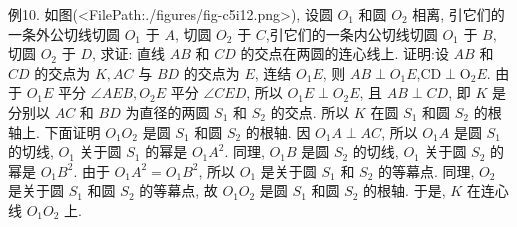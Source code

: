 例10. 如图(<FilePath:./figures/fig-c5i12.png>), 设圆 $O_1$ 和圆 $O_2$ 相离, 引它们的一条外公切线切圆 $O_1$ 于 $A$, 切圆 $O_2$ 于 $C$,引它们的一条内公切线切圆 $O_1$ 于 $B$, 切圆 $O_2$ 于 $D$, 求证: 直线 $A B$ 和 $C D$ 的交点在两圆的连心线上.
证明:设 $A B$ 和 $C D$ 的交点为 $K, A C$ 与 $B D$ 的交点为 $E$, 连结 $O_1 E$, 则 $A B \perp O_1 E$,$\mathrm{CD} \perp \mathrm{O}_2 E$.
由于 $O_1 E$ 平分 $\angle A E B, O_2 E$ 平分 $\angle C E D$, 所以 $O_1 E \perp O_2 E$, 且 $A B \perp C D$, 即 $K$ 是分别以 $A C$ 和 $B D$ 为直径的两圆 $S_1$ 和 $S_2$ 的交点.
所以 $K$ 在圆 $S_1$ 和圆 $S_2$ 的根轴上.
下面证明 $O_1 O_2$ 是圆 $S_1$ 和圆 $S_2$ 的根轴.
因 $O_1 A \perp A C$, 所以 $O_1 A$ 是圆 $S_1$ 的切线, $O_1$ 关于圆 $S_1$ 的幂是 $O_1 A^2$.
同理, $O_1 B$ 是圆 $S_2$ 的切线, $O_1$ 关于圆 $S_2$ 的幂是 $O_1 B^2$.
由于 $O_1 A^2=O_1 B^2$, 所以 $O_1$ 是关于圆 $S_1$ 和 $S_2$ 的等幕点.
同理, $O_2$ 是关于圆 $S_1$ 和圆 $S_2$ 的等幕点, 故 $O_1 O_2$ 是圆 $S_1$ 和圆 $S_2$ 的根轴.
于是, $K$ 在连心线 $O_1 O_2$ 上.


